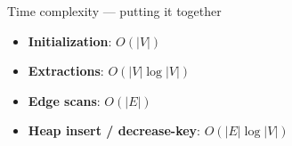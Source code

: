 \documentclass[aspectratio=169,10pt]{beamer}
\begin{document}
\begin{frame}[label=12e2]{Time complexity --- putting it together}
  \begin{itemize}\setlength{\itemsep}{9pt}
    \item<1-> \textbf{\textcolor{cbOrange}{Initialization}}: $O(|V|)$
    \item<2-> \textbf{\textcolor{cbGreen}{Extractions}}: $O(|V|\log|V|)$
    \item<3-> \textbf{\textcolor{rblue}{Edge scans}}: $O(|E|)$
    \item<4-> \textbf{\textcolor{cbRed}{Heap insert / decrease-key}}: $O(|E|\log|V|)$
  \end{itemize}

  \vspace{0.6em}
\end{frame}
\end{document}

